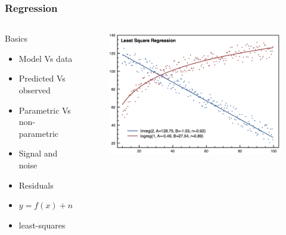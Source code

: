 \documentclass[10pt, compress]{beamer}
\begin{document}
\begin{frame}
    \frametitle{Regression}
    \begin{columns}
        \begin{block}{Basics}
            \begin{itemize}
                \item Model Vs data
                \item Predicted Vs observed
                \item Parametric Vs non-parametric
                \item Signal and noise
                \item Residuals
                \item $y = f(x) + n$
                \item least-squares
            \end{itemize}
        \end{block}
        \begin{block}{}
            \begin{figure}
                \begin{center}
                    \includegraphics[scale=0.2]{img/regression.png}
                \end{center}
            \end{figure}
        \end{block}
    \end{columns}
\end{frame}
\end{document}
